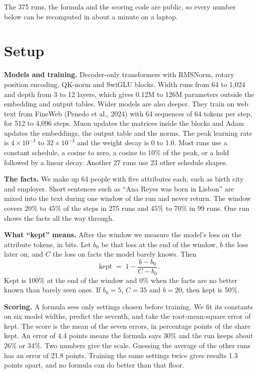 \documentclass{article}
\newcommand{\kept}{\mathrm{kept}}
\begin{document}
The 375 runs, the formula and the scoring code are public, so every number below can be recomputed in about a minute on a laptop.


\makeFNbelow
\section{Setup}

\textbf{Models and training.} Decoder-only transformers with RMSNorm, rotary position encoding, QK-norm and SwiGLU blocks. Width runs from 64 to 1,024 and depth from 3 to 12 layers, which gives 0.12M to 126M parameters outside the embedding and output tables. Wider models are also deeper. They train on web text from FineWeb (Penedo et al., 2024) with 64 sequences of 64 tokens per step, for 512 to 4,096 steps. Muon updates the matrices inside the blocks and Adam updates the embeddings, the output table and the norms. The peak learning rate is $4\times10^{-3}$ to $32\times10^{-3}$ and the weight decay is 0 to 1.0. Most runs use a constant schedule, a cosine to zero, a cosine to 10\% of the peak, or a hold followed by a linear decay. Another 27 runs use 23 other schedule shapes.

\textbf{The facts.} We make up 64 people with five attributes each, such as birth city and employer. Short sentences such as ``Ana Reyes was born in Lisbon'' are mixed into the text during one window of the run and never return. The window covers 20\% to 45\% of the steps in 275 runs and 45\% to 70\% in 99 runs. One run shows the facts all the way through.

\textbf{What ``kept'' means.} After the window we measure the model's loss on the attribute tokens, in bits. Let $b_0$ be that loss at the end of the window, $b$ the loss later on, and $C$ the loss on facts the model barely knows. Then
\begin{equation}
\kept \;=\; 1 - \frac{b - b_0}{C - b_0}.
\end{equation}
Kept is 100\% at the end of the window and 0\% when the facts are no better known than barely seen ones. If $b_0 = 5$, $C = 35$ and $b = 20$, then kept is 50\%.

\textbf{Scoring.} A formula sees only settings chosen before training. We fit its constants on six model widths, predict the seventh, and take the root-mean-square error of kept. The score is the mean of the seven errors, in percentage points of the share kept. An error of 4.4 points means the formula says 30\% and the run keeps about 26\% or 34\%. Two numbers give the scale. Guessing the average of the other runs has an error of 21.8 points. Training the same settings twice gives results 1.3 points apart, and no formula can do better than that floor.
\end{document}
